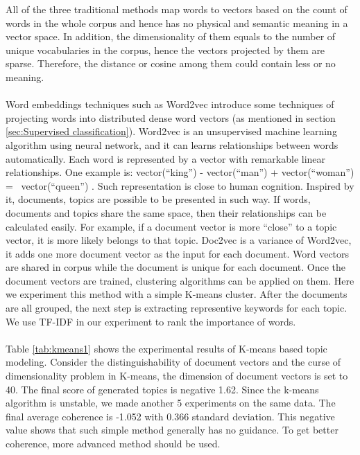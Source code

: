 All of the three traditional methods map words to vectors based on the count of words in the whole corpus and hence has no physical and semantic meaning in a vector space. In addition, the dimensionality of them equals to the number of unique vocabularies in the corpus, hence the vectors projected by them are sparse. Therefore, the distance or cosine among them could contain less or no meaning.
\\\\Word embeddings techniques such as Word2vec \cite{mikolov2013distributed,mikolov2013efficient} introduce some techniques of projecting words into distributed dense word vectors (as mentioned in section \ref{sec:Supervised classification}). Word2vec is an unsupervised machine learning algorithm using neural network, and it can learns relationships between words automatically. Each word is represented by a vector with remarkable linear relationships. One example is: vector(“king”) - vector(“man”) + vector(“woman”) =~ vector(“queen”) \cite{journals/corr/cs-CL-0205028}. Such representation is close to human cognition. Inspired by it, documents, topics are possible to be presented in such way. If words, documents and topics share the same space, then their relationships can be calculated easily. For example, if a document vector is more ``close'' to a topic vector, it is more likely belongs to that topic. Doc2vec \cite{le2014distributed} is a variance of Word2vec, it adds one more document vector as the input for each document. Word vectors are shared in corpus while the document is unique for each document. Once the document vectors are trained, clustering algorithms can be applied on them. Here we experiment this method with a simple K-means cluster. 
After the documents are all grouped, the next step is extracting representive keywords for each topic. We use TF-IDF in our experiment to rank the importance of words. 
\\\\
Table \ref{tab:kmeans1} shows the experimental results of K-means based topic modeling. Consider the distinguishability of document vectors and the curse of dimensionality problem in K-means, the dimension of document vectors is set to 40. The final score of generated topics is negative 1.62. Since the k-means algorithm is unstable, we made another 5 experiments on the same data. The final average coherence is -1.052 with 0.366 standard deviation. This negative value shows that such simple method generally has no guidance. To get better coherence, more advanced method should be used.
